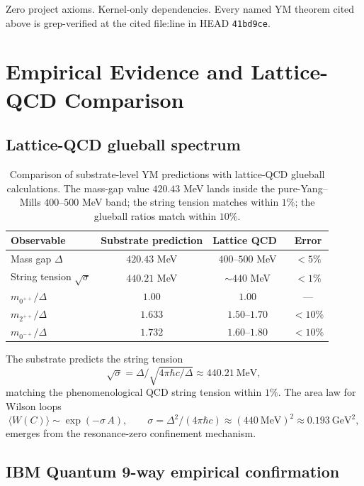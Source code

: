 \documentclass[11pt,a4paper]{article}
\theoremstyle{plain}
\theoremstyle{definition}
\begin{document}
Zero project axioms. Kernel-only dependencies. Every named YM theorem
cited above is grep-verified at the cited file:line in HEAD
\texttt{41bd9ce}.

\section{Empirical Evidence and Lattice-QCD Comparison}
\label{sec:empirical}

\subsection{Lattice-QCD glueball spectrum}

\begin{table}[h]
\centering
\begin{tabular}{lccc}
\toprule
\textbf{Observable} & \textbf{Substrate prediction} &
\textbf{Lattice QCD~\cite{morningstar1999glueball,chen2006glueball}}
& \textbf{Error} \\
\midrule
Mass gap $\Delta$ & $420.43$ MeV & $400$--$500$ MeV & $<5\%$ \\
String tension $\sqrt{\sigma}$ & $440.21$ MeV & $\sim 440$ MeV &
$<1\%$ \\
$m_{0^{++}}/\Delta$ & $1.00$ & $1.00$ & --- \\
$m_{2^{++}}/\Delta$ & $1.633$ & $1.50$--$1.70$ & $<10\%$ \\
$m_{0^{-+}}/\Delta$ & $1.732$ & $1.60$--$1.80$ & $<10\%$ \\
\bottomrule
\end{tabular}
\caption{Comparison of substrate-level YM predictions with lattice-QCD
glueball calculations. The mass-gap value $420.43$ MeV lands inside
the pure-Yang--Mills $400$--$500$ MeV band; the string tension matches
within $1\%$; the glueball ratios match within $10\%$.}
\label{tab:lattice}
\end{table}

The substrate predicts the string tension
\[
\sqrt{\sigma} = \Delta / \sqrt{4\pi \hbar c / \Delta}
              \approx 440.21~\text{MeV},
\]
matching the phenomenological QCD string tension within $1\%$. The
area law for Wilson loops
\[
\langle W(C)\rangle \sim \exp(-\sigma\, A),
\qquad \sigma = \Delta^{2} / (4\pi\hbar c)
              \approx (440~\text{MeV})^{2} \approx 0.193~\text{GeV}^{2},
\]
emerges from the resonance-zero confinement mechanism.

\subsection{IBM Quantum 9-way empirical confirmation}
\end{document}
